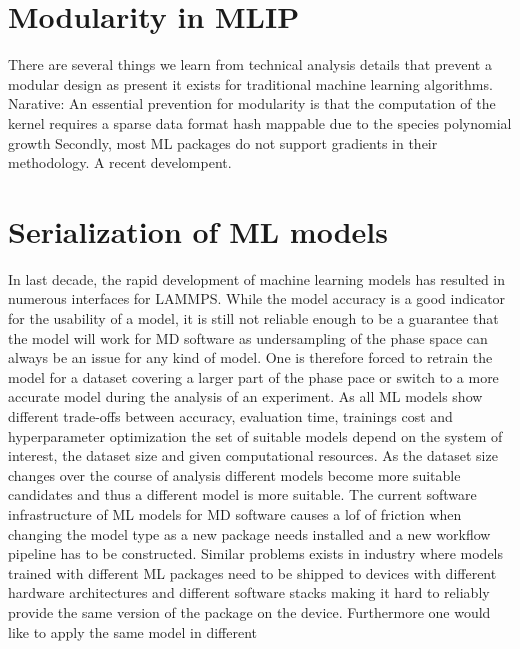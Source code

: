 \section{Modularity in MLIP}
There are several things we learn from technical analysis details that prevent a modular design as present it exists for traditional machine learning algorithms.
Narative:
An essential prevention for modularity is that the computation of the kernel requires a sparse data format hash mappable due to the species polynomial growth
Secondly, most ML packages do not support gradients in their methodology.
A recent develompent.


\section{Serialization of ML models}
In last decade, the rapid development of machine learning models has resulted in numerous interfaces for LAMMPS\cite{TODO}.
While the model accuracy is a good indicator for the usability of a model, it is still not reliable enough to be a guarantee that the model will work for MD software as undersampling of the phase space can always be an issue for any kind of model.
One is therefore forced to retrain the model for a dataset covering a larger part of the phase pace or switch to a more accurate model during the analysis of an experiment.
As all ML models show different trade-offs between accuracy, evaluation time, trainings cost and hyperparameter optimization the set of suitable models depend on the system of interest, the dataset size and given computational resources.
As the dataset size changes over the course of analysis different models become more suitable candidates and thus a different model is more suitable.
The current software infrastructure of ML models for MD software causes a lof of friction when changing the model type as a new package needs installed and a new workflow pipeline has to be constructed.
Similar problems exists in industry where models trained with different ML packages need to be shipped to devices with different hardware architectures and different software stacks making it hard to reliably provide the same version of the package on the device.
Furthermore one would like to apply the same model in different

